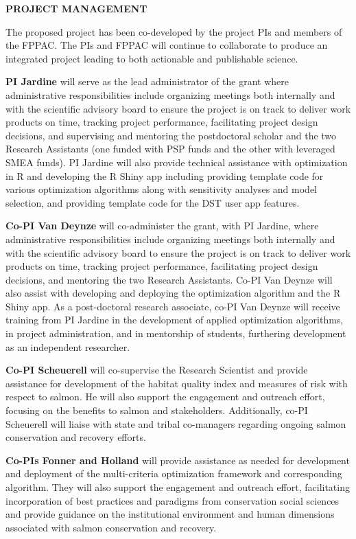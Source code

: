 \begin{center} \textbf{PROJECT MANAGEMENT} \end{center}

The proposed project has been co-developed by the project PIs and members of the FPPAC. The PIs and FPPAC will continue to collaborate to produce an integrated project leading to both actionable and publishable science. 

\textbf{PI Jardine} will serve as the lead administrator of the grant where administrative responsibilities include organizing meetings both internally and with the scientific advisory board to ensure the project is on track to deliver work products on time, tracking project performance, facilitating project design decisions, and supervising and mentoring the postdoctoral scholar and the two Research Assistants (one funded with PSP funds and the other with leveraged SMEA funds). PI Jardine will also provide technical assistance with optimization in R and developing the R Shiny app including providing template code for various optimization algorithms along with sensitivity analyses and model selection, and providing template code for the DST user app features.

\textbf{Co-PI Van Deynze} will co-administer the grant, with PI Jardine, where administrative responsibilities include organizing meetings both internally and with the scientific advisory board to ensure the project is on track to deliver work products on time, tracking project performance, facilitating project design decisions, and mentoring the two Research Assistants. Co-PI Van Deynze will also assist with developing and deploying the optimization algorithm and the R Shiny app. As a post-doctoral research associate, co-PI Van Deynze will receive training from PI Jardine in the development of applied optimization algorithms, in project administration, and in mentorship of students, furthering development as an independent researcher. 

\textbf{Co-PI Scheuerell} will co-supervise the Research Scientist and provide assistance for development of the habitat quality index and measures of risk with respect to salmon. He will also support the engagement and outreach effort, focusing on the benefits to salmon and stakeholders. Additionally, co-PI Scheuerell will liaise with state and tribal co-managers regarding ongoing salmon conservation and recovery efforts.


\textbf{Co-PIs Fonner and Holland} will provide assistance as needed for development and deployment of the multi-criteria optimization framework and corresponding algorithm. They will also support the engagement and outreach effort, facilitating incorporation of best practices and paradigms from conservation social sciences and provide guidance on the institutional environment and human dimensions associated with salmon conservation and recovery.


